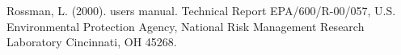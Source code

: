 \documentclass[12pt]{article}
\begin{document}
\begin{thebibliography}{}
%
%

%
%

Rossman, L. (2000).
 users manual.
\newblock Technical Report EPA/600/R-00/057, U.S. Environmental Protection
  Agency, National Risk Management Research Laboratory Cincinnati, OH 45268.
%

\end{thebibliography}
\end{document}
